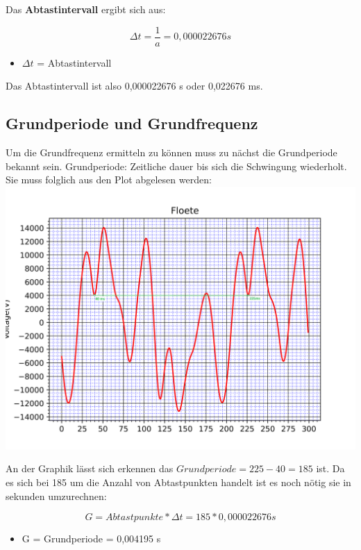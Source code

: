 Das \textbf{Abtastintervall} ergibt sich aus:

\begin{equation}
	\Delta t = \frac{1}{a} = 0,000022676 s
\end{equation}
\begin{itemize}
	\item $\Delta t$ = Abtastintervall
\end{itemize}

Das Abtastintervall ist also 0,000022676 s oder 0,022676 ms.

\subsection*{Grundperiode und Grundfrequenz}

Um die Grundfrequenz ermitteln zu können muss zu nächst die Grundperiode bekannt sein.
Grundperiode: Zeitliche dauer bis sich die Schwingung wiederholt. Sie muss folglich aus den Plot abgelesen werden:
\includegraphics[scale=0.05]{media/Signal_Raster_Periode.png}

An der Graphik lässt sich erkennen das $ Grundperiode = 225 - 40 = 185 $ ist.
Da es sich bei 185 um die Anzahl von Abtastpunkten handelt ist es noch nötig sie in sekunden umzurechnen:

\begin{equation}
	G = Abtastpunkte \ast \Delta t = 185 \ast 0,000022676 s
\end{equation}
\begin{itemize}
	\item G = Grundperiode = 0,004195 s 
\end{itemize}

